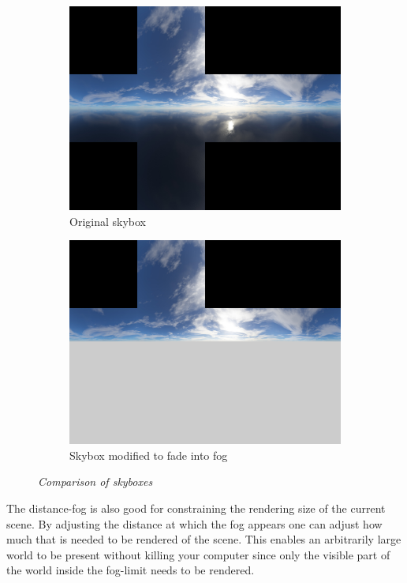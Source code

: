 \begin{figure}[H]
\begin{subfigure}{.5\textwidth}
  \centering
  \includegraphics[width=0.9\linewidth]{images/skybox0.jpg}
  \caption{Original skybox}
  \label{fig:skybox0}
\end{subfigure}%
\begin{subfigure}{.5\textwidth}
  \centering
  \includegraphics[width=0.9\linewidth]{images/skybox1.jpg}
  \caption{Skybox modified to fade into fog}
  \label{fig:skybox1}
\end{subfigure}
\caption[Noise comparison]{\textit{Comparison of skyboxes}}
\label{fig:SkyboxComparison}
\end{figure}

The distance-fog is also good for constraining the rendering size of the current scene. By adjusting the distance at which the fog appears one can adjust how much that is needed to be rendered of the scene. This enables an arbitrarily large world to be present without killing your computer since only the visible part of the world inside the fog-limit needs to be rendered. 

